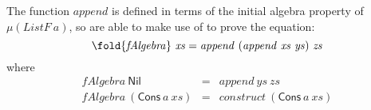 \begin{proof*}
  The function $\mathit{append}$ is defined in terms of the initial
  algebra property of $\mu(\mathit{ListF}~a)$, so are able to
  make use of  to prove the equation:
  \begin{displaymath}
    \fold{\mathit{fAlgebra}}~\mathit{xs} = \mathit{append}~(\mathit{append}~\mathit{xs}~\mathit{ys})~\mathit{zs}
  \end{displaymath}
  where
  \begin{eqnarray}
    \label{eq:append-fAlgebra-nil}
    \mathit{fAlgebra}~\mathsf{Nil} &=& \mathit{append}~\mathit{ys}~\mathit{zs} \\
    \label{eq:append-fAlgebra-cons}
    \mathit{fAlgebra}~(\mathsf{Cons}~a~\mathit{xs}) &=& \mathit{construct}~(\mathsf{Cons}~a~\mathit{xs})
  \end{eqnarray}


\end{proof*}
